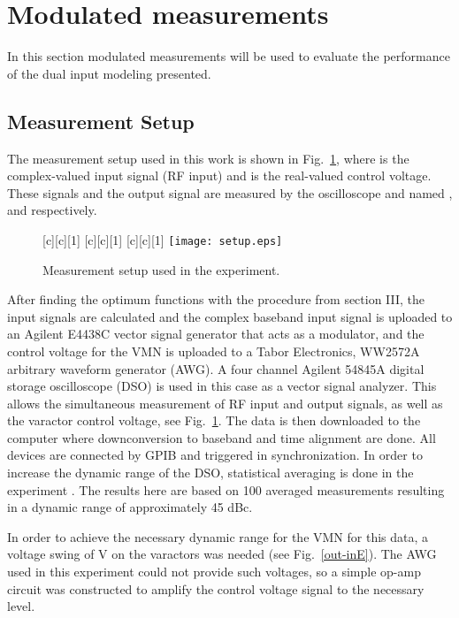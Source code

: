\documentclass[10pt,journal]{IEEEtran}
\begin{document}
\section{Modulated measurements}
In this section modulated measurements will be used to evaluate the performance of the dual input modeling presented.

\subsection{Measurement Setup}
The measurement setup used in this work is shown in Fig.~\ref{setup}, where  is the complex-valued input signal (RF input) and  is the real-valued control voltage. These signals and the output signal  are measured by the oscilloscope and named ,  and  respectively.

\begin{figure}
\centering {}[c][c][1]{}
[c][c][1]{}
[c][c][1]{}
\texttt{[image: setup.eps]}
\caption{Measurement setup used in the experiment.} \label{setup}
\end{figure}

After finding the optimum functions with the procedure from section III, the input signals are calculated and the complex baseband input signal is uploaded to an Agilent E4438C vector signal generator that acts as a modulator, and the control voltage for the VMN is uploaded to a Tabor Electronics, WW2572A arbitrary waveform generator (AWG). A four channel Agilent 54845A digital storage oscilloscope (DSO) is used in this case as a vector signal analyzer. This allows the simultaneous measurement of RF input and output signals, as well  as the varactor control voltage, see Fig.~\ref{setup}. The data is then downloaded to the  computer where downconversion to baseband and time alignment are done. All devices are connected by GPIB and triggered in synchronization. In order to increase the dynamic range  of the DSO, statistical averaging is done in the experiment  \cite{fager}. The results here  are based on 100 averaged measurements resulting in a dynamic range of approximately 45 dBc.

In order to achieve the necessary dynamic range for the VMN for this data, a
voltage swing of  V on the varactors was needed (see Fig.~\ref{out-inE}). The AWG
used in this experiment could not provide such voltages, so a  simple
op-amp circuit was constructed to amplify the control voltage signal
to the necessary level.
\end{document}
